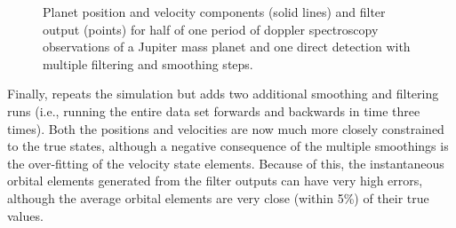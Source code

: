   \begin{figure}[ht]
 \begin{center}
 \end{center}
 \caption[Filter and smoother output for RV and imaging]{Planet position and velocity components (solid lines) and filter output (points) for half of one period of doppler spectroscopy observations of a Jupiter mass planet and one direct detection with multiple filtering and smoothing steps. \label{fig:filtOutRVdd2}}
 \end{figure}
 
 Finally,  repeats the simulation but adds two additional smoothing and filtering runs (i.e., running the entire data set forwards and backwards in time three times).  Both the positions and velocities are now much more closely constrained to the true states, although a negative consequence of the multiple smoothings is the over-fitting of the velocity state elements.  Because of this, the instantaneous orbital elements generated from the filter outputs can have very high errors, although the average orbital elements are very close (within 5\%) of their true values.

